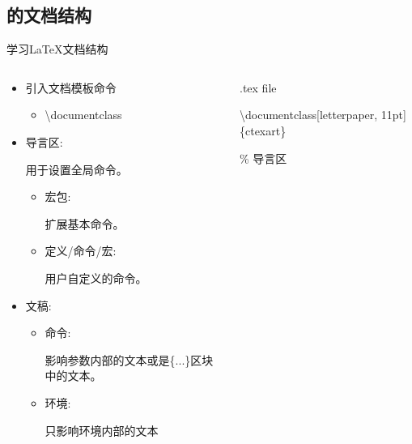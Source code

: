 \documentclass[fontset = adobe, xcolor=svgnames, t, aspectratio=169]{ctexbeamer}
\begin{document}
\subsection[文档结构]{\latex 的文档结构}\label{sec02-02}
\begin{frame}[t, fragile]{学习\LaTeX}{文档结构}
  \begin{columns}
    \begin{column}{0.5\textwidth}      
      \begin{itemize}
      \item {引入文档模板命令}\\
        \begin{itemize}
        \item {\textbackslash documentclass}
        \end{itemize}
      \item {导言区:} \par
        用于设置全局命令。
        \begin{itemize}
        \item {宏包:} \par
          扩展基本\latex 命令。
        \item { 定义/命令/宏:}\par
          用户自定义的命令。
        \end{itemize}
      \item {文稿:}
        \begin{itemize}
        \item {命令:} \par
          影响参数内部的文本或是\{...\}区块中的文本。  
        \item {环境:} \par
          只影响环境内部的文本
        \end{itemize}
      \end{itemize}
    \end{column}

    \begin{column}{0.45\textwidth}
      \begin{block}{.tex file}
        {
          \tiny \ttfamily
         { \textbackslash documentclass[letterpaper, 11pt]\{ctexart\}} \par
         {\% 导言区 \par          
           \par
       }\par
         
}
\end{block}
\end{column}
\end{columns}
\end{frame}
\end{document}
